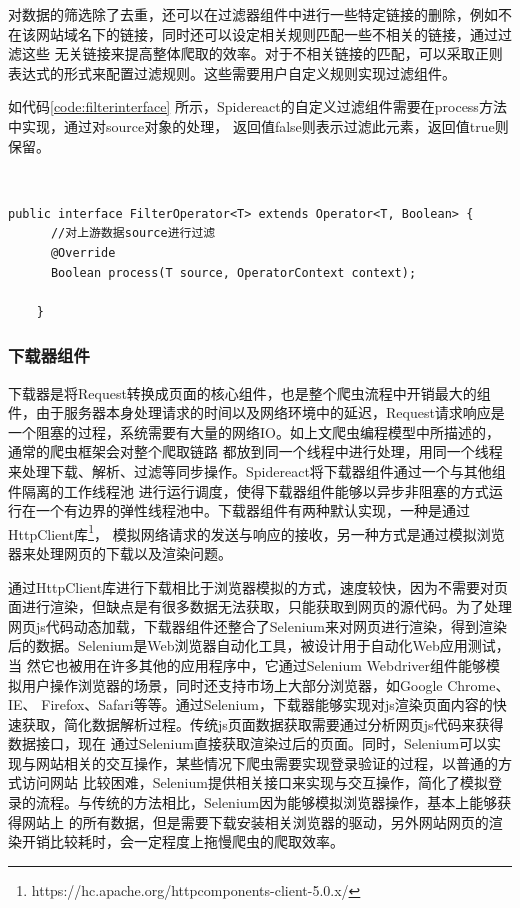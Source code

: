 \documentclass[master]{njuthesis}
\begin{document}
对数据的筛选除了去重，还可以在过滤器组件中进行一些特定链接的删除，例如不在该网站域名下的链接，同时还可以设定相关规则匹配一些不相关的链接，通过过滤这些
无关链接来提高整体爬取的效率。对于不相关链接的匹配，可以采取正则表达式的形式来配置过滤规则。这些需要用户自定义规则实现过滤组件。

如代码\ref{code:filterinterface} 所示，Spidereact的自定义过滤组件需要在process方法中实现，通过对source对象的处理，
返回值false则表示过滤此元素，返回值true则保留。

~\\


\begin{lstlisting}[label = code:filterinterface, caption = {过滤组件接口}]
    public interface FilterOperator<T> extends Operator<T, Boolean> {
      //对上游数据source进行过滤
      @Override
      Boolean process(T source, OperatorContext context);

    }
\end{lstlisting}


\subsubsection{下载器组件}

下载器是将Request转换成页面的核心组件，也是整个爬虫流程中开销最大的组件，由于服务器本身处理请求的时间以及网络环境中的延迟，Request请求响应是一个阻塞的过程，系统需要有大量的网络IO。如上文爬虫编程模型中所描述的，通常的爬虫框架会对整个爬取链路
都放到同一个线程中进行处理，用同一个线程来处理下载、解析、过滤等同步操作。Spidereact将下载器组件通过一个与其他组件隔离的工作线程池
进行运行调度，使得下载器组件能够以异步非阻塞的方式运行在一个有边界的弹性线程池中。下载器组件有两种默认实现，一种是通过HttpClient库\footnote{https://hc.apache.org/httpcomponents-client-5.0.x/}，
模拟网络请求的发送与响应的接收，另一种方式是通过模拟浏览器来处理网页的下载以及渲染问题。

通过HttpClient库进行下载相比于浏览器模拟的方式，速度较快，因为不需要对页面进行渲染，但缺点是有很多数据无法获取，只能获取到网页的源代码。为了处理
网页js代码动态加载，下载器组件还整合了Selenium来对网页进行渲染，得到渲染后的数据。Selenium是Web浏览器自动化工具，被设计用于自动化Web应用测试，当
然它也被用在许多其他的应用程序中，它通过Selenium Webdriver组件能够模拟用户操作浏览器的场景，同时还支持市场上大部分浏览器，如Google Chrome、IE、
Firefox、Safari等等。通过Selenium，下载器能够实现对js渲染页面内容的快速获取，简化数据解析过程。传统js页面数据获取需要通过分析网页js代码来获得数据接口，现在
通过Selenium直接获取渲染过后的页面。同时，Selenium可以实现与网站相关的交互操作，某些情况下爬虫需要实现登录验证的过程，以普通的方式访问网站
比较困难，Selenium提供相关接口来实现与交互操作，简化了模拟登录的流程。与传统的方法相比，Selenium因为能够模拟浏览器操作，基本上能够获得网站上
的所有数据，但是需要下载安装相关浏览器的驱动，另外网站网页的渲染开销比较耗时，会一定程度上拖慢爬虫的爬取效率。
\end{document}
